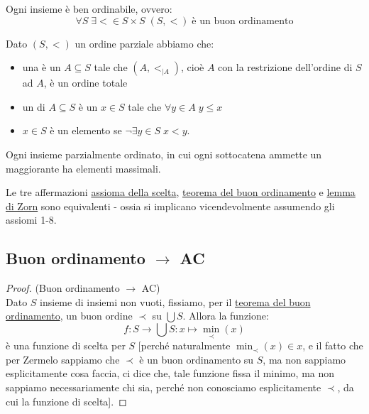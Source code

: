 \begin{theorem}
	\label{buon_ordinamento}
	Ogni insieme \`e ben ordinabile, ovvero:
	\[ \forall S \; \exists < \in S \times S \; (S,<)\;\text{\`e un buon ordinamento}
		\]
\end{theorem}

\begin{definition}
	Dato $(S,<)$ un ordine parziale abbiamo che:
	\begin{itemize}
		\item una  \`e un $A \subseteq S$ tale che $(A,<_{|A})$, cio\`e $A$ con la restrizione dell'ordine di $S$ ad $A$, \`e un ordine totale
		\item un  di $A \subseteq S$ \`e un $x \in S$ tale che $\forall y \in A \; y \leq x$
		\item $x \in S$ \`e un elemento  se $\neg \exists y \in S \; x < y$.
	\end{itemize}
\end{definition}

\begin{lemma}
	\label{Zorn}
	Ogni insieme parzialmente ordinato, in cui ogni sottocatena ammette un maggiorante ha elementi massimali.
\end{lemma}

\begin{theorem}
	Le tre affermazioni \hyperref[ax9]{assioma della scelta}, \hyperref[buon_ordinamento]{teorema del buon ordinamento} e \hyperref[Zorn]{lemma di Zorn} sono equivalenti -
	ossia si implicano vicendevolmente assumendo gli assiomi 1-8.
\end{theorem}

\subsection{\texorpdfstring{Buon ordinamento $\rightarrow$ AC}{Buon ordinamento implica AC}}

\begin{proof}
	(Buon ordinamento $\rightarrow$ AC)\\
	Dato $S$ insieme di insiemi non vuoti, fissiamo, per il \hyperref[buon_ordinamento]{teorema del buon ordinamento}, un buon ordine $\prec$ su $\bigcup S$. Allora la funzione:
	\[ f : S \rightarrow \bigcup S : x \mapsto \min_{\prec}(x)
		\]
	\`e una funzione di scelta per $S$ [perch\'e naturalmente $\min_\prec (x) \in x$, e il fatto che per Zermelo sappiamo che $\prec$ \`e un buon ordinamento su $S$, ma non sappiamo esplicitamente cosa faccia, ci dice che, tale funzione fissa il minimo, ma non sappiamo necessariamente chi sia, perch\'e non 
	conosciamo esplicitamente $\prec$, da cui la funzione di scelta].
\end{proof}

